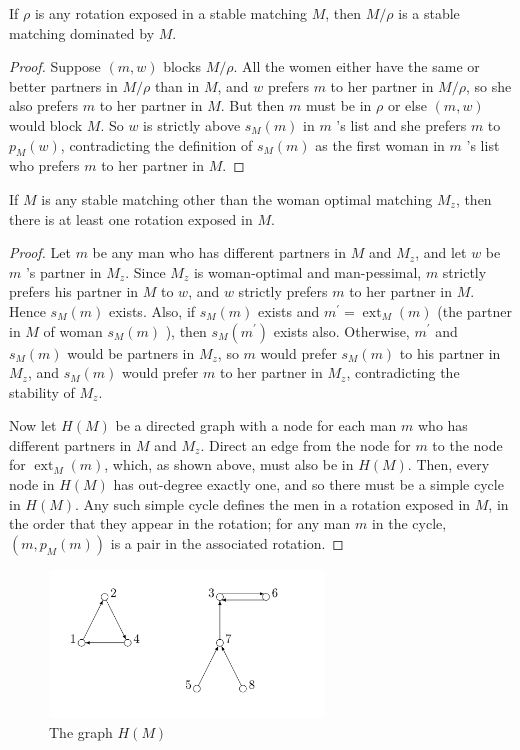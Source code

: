 \begin{lemma}\label{lem_3_2}
    If $\rho$ is any rotation exposed in a stable matching $M$, then $M / \rho$ is a stable matching dominated by $M$.
\end{lemma}

\begin{proof}
    Suppose $(m, w)$ blocks $M / \rho$. All the women either have the same or better partners in $M / \rho$ than in $M$, and $w$ prefers $m$ to her partner in $M / \rho$, so she also prefers $m$ to her partner in $M$. But then $m$ must be in $\rho$ or else $(m, w)$ would block $M$. So $w$ is strictly above $s_M(m)$ in $m$ 's list and she prefers $m$ to $p_M(w)$, contradicting the definition of $s_M(m)$ as the first woman in $m$ 's list who prefers $m$ to her partner in $M$.
\end{proof}


\begin{lemma}\label{lem_3_3}
    If $M$ is any stable matching other than the woman optimal matching $M_z$, then there is at least one rotation exposed in $M$.
\end{lemma}


\begin{proof}
    Let $m$ be any man who has different partners in $M$ and $M_z$, and let $w$ be $m$ 's partner in $M_z$. Since $M_z$ is woman-optimal and man-pessimal, $m$ strictly prefers his partner in $M$ to $w$, and $w$ strictly prefers $m$ to her partner in $M$. Hence $s_M(m)$ exists. Also, if $s_M(m)$ exists and $m^{\prime}=\operatorname{ext}_M(m)$ (the partner in $M$ of woman $s_M(m)$ ), then $s_M\left(m^{\prime}\right)$ exists also. Otherwise, $m^{\prime}$ and $s_M(m)$ would be partners in $M_z$, so $m$ would prefer $s_M(m)$ to his partner in $M_z$, and $s_M(m)$ would prefer $m$ to her partner in $M_z$, contradicting the stability of $M_z$.

    Now let $H(M)$ be a directed graph with a node for each man $m$ who has different partners in $M$ and $M_z$. Direct an edge from the node for $m$ to the node for $\operatorname{ext}_M(m)$, which, as shown above, must also be in $H(M)$. Then, every node in $H(M)$ has out-degree exactly one, and so there must be a simple cycle in $H(M)$. Any such simple cycle defines the men in a rotation exposed in $M$, in the order that they appear in the rotation; for any man $m$ in the cycle, $\left(m, p_M(m)\right)$ is a pair in the associated rotation.
\end{proof}

\begin{figure}[h]
  \centering
  \includegraphics[width=0.65\textwidth]{IMAGES_FIGS/FIG_2_7.png}
  \caption{The graph $H(M)$}
  \label{FIG_3_3}
\end{figure}

